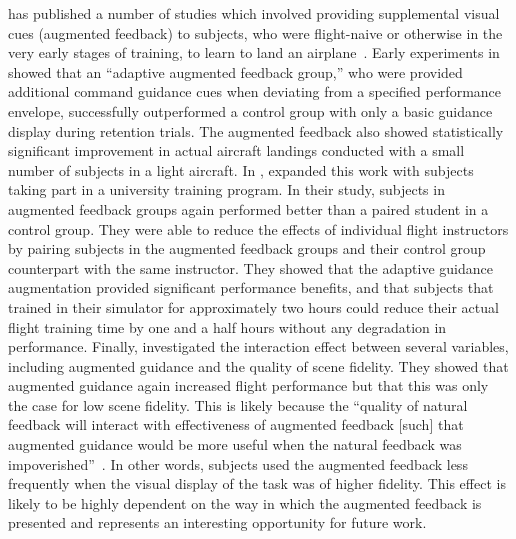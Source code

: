 \citeauthor{doi:10.1177/001872088002200109} has published a number of studies which involved providing supplemental visual cues (augmented feedback) to subjects, who were flight-naive or otherwise in the very early stages of training, to learn to land an airplane~\citep{doi:10.1177/001872088002200109, doi:10.1177/001872089003200305, doi:10.1207/s15327108ijap0702_4}.
Early experiments in \citeyear{doi:10.1177/001872088002200109} showed that an ``adaptive augmented feedback group,'' who were provided additional command guidance cues when deviating from a specified performance envelope, successfully outperformed a control group with only a basic guidance display during retention trials.
The augmented feedback also showed statistically significant improvement in actual aircraft landings conducted with a small number of subjects in a light aircraft.
In \citeyear{doi:10.1177/001872089003200305}, \citeauthor{doi:10.1177/001872089003200305} expanded this work with subjects taking part in a university training program.
In their study, subjects in augmented feedback groups again performed better than a paired student in a control group.
They were able to reduce the effects of individual flight instructors by pairing subjects in the augmented feedback groups and their control group counterpart with the same instructor.
They showed that the adaptive guidance augmentation provided significant performance benefits, and that subjects that trained in their simulator for approximately two hours could reduce their actual flight training time by one and a half hours without any degradation in performance.
Finally, \citet{doi:10.1207/s15327108ijap0702_4} investigated the interaction effect between several variables, including augmented guidance and the quality of scene fidelity.
They showed that augmented guidance again increased flight performance but that this was only the case for low scene fidelity.
This is likely because the ``quality of natural feedback will interact with effectiveness of augmented feedback [such] that augmented guidance would be more useful when the natural feedback was impoverished''~\citep{doi:10.1207/s15327108ijap0702_4}.
In other words, subjects used the augmented feedback less frequently when the visual display of the task was of higher fidelity.
This effect is likely to be highly dependent on the way in which the augmented feedback is presented and represents an interesting opportunity for future work.

